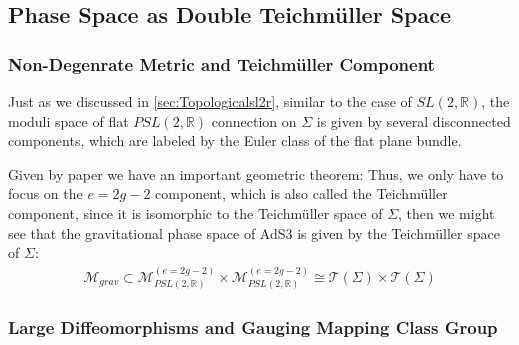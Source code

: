 \subsection{Phase Space as Double Teichmüller Space}

\subsubsection{Non-Degenrate Metric and Teichmüller Component}

Just as we discussed in \cref{sec:Topologicalsl2r}, similar to the
case of $ SL(2,\mathbb{R}) $, the moduli space of flat
$PSL(2,\mathbb{R}) $ connection on $ \Sigma $ is given by several
disconnected components, which are labeled by the Euler class of the
flat plane bundle.

Given by paper \cite{krasnovMinimalSurfacesParticles2007,
scarinciUniversalPhaseSpace2013} we have an important geometric theorem:
Thus, we only have to focus on the $ e = 2g -2 $ component, which is
also called the
Teichmüller component, since it is isomorphic to the Teichmüller
space of $ \Sigma $, then we might see that the gravitational phase
space of AdS3 is given by the Teichmüller space of $ \Sigma $:
\begin{align}
  \mathcal{M}_{grav} \subset \mathcal{M}_{PSL(2,\mathbb{R})}^{(e = 2g
  -2)} \times \mathcal{M}_{PSL(2,\mathbb{R})}^{(e = 2g -2)} \cong
  \mathcal{T}(\Sigma) \times \mathcal{T}(\Sigma)
\end{align}

\subsubsection{Large Diffeomorphisms and Gauging Mapping Class Group}

